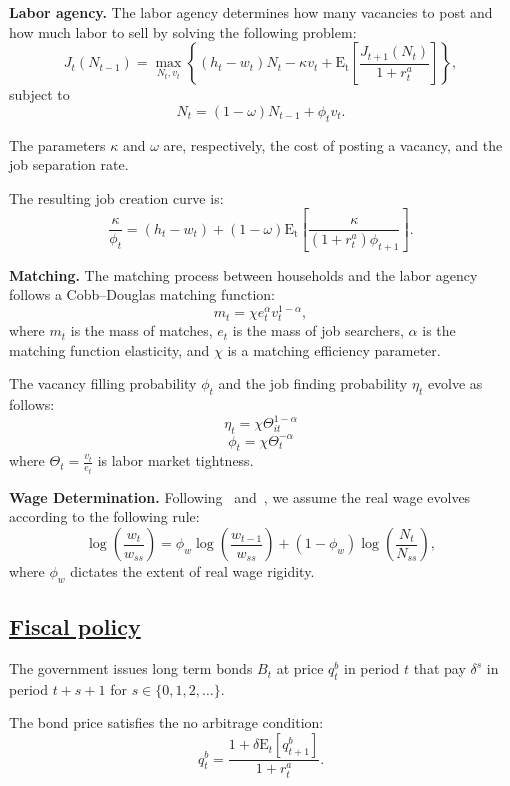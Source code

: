 \documentclass[qe,draft]{econsocart}
\theoremstyle{plain}
\theoremstyle{definition}
\begin{document}
\textbf{Labor agency.} The labor agency determines how many vacancies to post and how much labor to sell by solving the following problem:
\[
  J_{t}(N_{t-1})  = \max_{N_{t},v_{t}} \left\{( h_{t} - w_{t}) N_{t}- \kappa v_{t} + \mathrm{E_{t}}\left[ \frac{J_{t+1}(N_{t})}{1 + r^{a}_{t}}\right]\right\},
\]
subject to
\[
  N_{t} = (1-\omega)N_{t-1} + \phi_{t} v_{t}.
\]

The parameters $\kappa$ and $\omega$ are, respectively, the cost of posting a vacancy, and the job separation rate.

The resulting job creation curve is:
\[
  \frac{\kappa}{\phi_{t}}  = (h_{t} - w_{t})+  (1-\omega)\mathrm{E_{t}}\left[   \frac{\kappa}{(1+r^{a}_{t}) \phi_{t+1}} \right].
\]

\textbf{Matching.} The matching process between households and the labor agency follows a Cobb--Douglas matching function:
\[
  m_{t} = \chi e_{t}^{\alpha} v_{t}^{1-\alpha},
\]
where $m_{t}$ is the mass of matches, $e_{t}$ is the mass of job searchers, $\alpha$ is the matching function elasticity, and $\chi$ is a matching efficiency parameter.

The vacancy filling probability \( \phi_t \) and the job finding probability \( \eta_t \) evolve as follows:
\[
  \eta_{t} = \chi \Theta_{it}^{1-\alpha}
\]
\[
  \phi_{t} = \chi \Theta_{t}^{-\alpha}
\]
where $\Theta_{t} = \frac{v_{t}}{e_{t}}$ is labor market tightness.

\textbf{Wage Determination.} Following~\cite{Gornemann2021} and~\cite{Blanchard2010}, we assume the real wage evolves according to the following rule:
\[
  \log\left(\frac{w_{t}}{w_{ss}}\right)  = \phi_w \log\left( \frac{ w_{t-1}}{ w_{ss}} \right) +   (1 - \phi_w) \log\left( \frac{N_{t}}{N_{ss}}\right),
\]
where $\phi_w$ dictates the extent of real wage rigidity.

\subsection{\href{https://econ-ark.github.io/HAFiscal/\#sec:hank-fiscal-policy}{Fiscal policy}}\label{sec:hank-fiscal-policy}

The government issues long term bonds $B_{t}$ at price $q^{b}_{t}$ in period $t$ that pay $\delta^{s}$ in period $t+s+1$ for $s \in \{0,1,2,\ldots\}$.

The bond price satisfies the no arbitrage condition:
\[
  q^{b}_{t} = \frac{ 1  + \delta \mathrm{E}_{t}[q^{b}_{t+1}]}{1+r^{a}_{t}}.
\]
\end{document}
